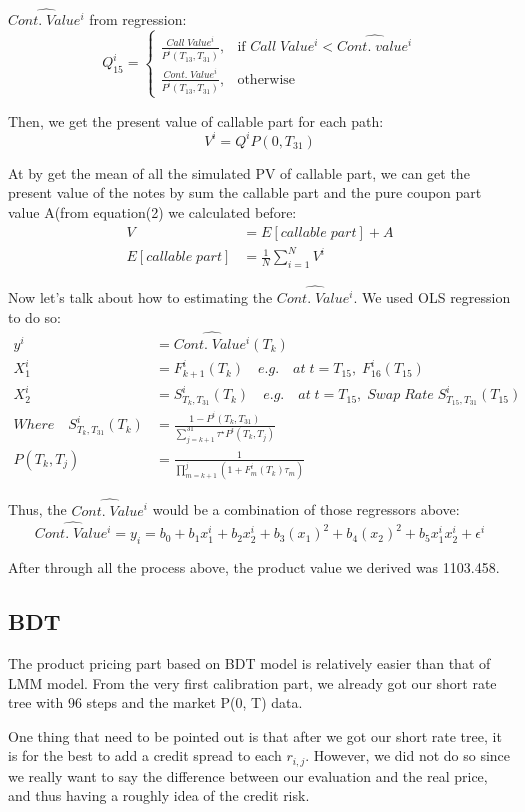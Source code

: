 \documentclass[paper = letterpaper, fontsize=12pt]{article}
\begin{document}
$\hat{Cont.\;Value^i}$ from regression:
\[
    Q_{15}^i = 
\begin{cases}
    \frac{Call\;Value^i}{P^i(T_{13}, T_{31})},& \text{if } Call\;Value^i< \hat{Cont.\; value^i}\\
    \frac{Cont.\;Value^i}{P^i(T_{13}, T_{31})},              & \text{otherwise}
\end{cases}
\]

Then, we get the present value of callable part for each path:
\[
  V^i = Q^iP(0, T_{31})
\]

At by get the mean of all the simulated PV of callable part, we can get the present value of the notes by sum the callable part and the pure coupon part value A(from equation(2) we calculated before:
\begin{align}
  V &= E[callable\;part]+ A\\
  E[callable\;part] &= \frac{1}{N} \sum_{i=1}^{N}V^i
\end{align}

Now let's talk about how to estimating the $\hat{Cont.\;Value^i}$. We used OLS regression to do so:
\begin{align}
  y^i &= \hat{Cont.\;Value^i}(T_k)\\
  X_1^i &= F_{k+1}^i(T_k)\quad e.g. \quad at\;t=T_{15},\;F_{16}^i(T_{15})\\
  X_2^i &= S_{T_k, T_{31}}^i(T_k)\quad e.g. \quad at\;t=T_{15},\;Swap\;Rate\;S_{T_{15}, T_{31}}^i(T_{15})\\
  Where \quad S_{T_k, T_{31}}^i(T_k) &= \frac{1 - P^i(T_k, T_{31})}{\sum_{j=k+1}^{31} \tau^\star P^i(T_k, T_j)}\\
  P(T_k, T_j) &= \frac{1}{\prod_{m = k+1}^j(1+F_m^i(T_k)\tau_m)}
\end{align}

Thus, the $\hat{Cont.\;Value^i}$ would be a combination of those regressors above:
\[
\hat{Cont.\;Value^i} = y_i = b_0 + b_1x_1^i + b_2x_2^i + b_3(x_1)^2 + b_4(x_2)^2 + b_5x_1^ix_2^i + \epsilon^i
\]

After through all the process above, the product value we derived was 1103.458.
\subsection{BDT}
The product pricing part based on BDT model is relatively easier than that of LMM model. From the very first calibration part, we already got our short rate tree with 96 steps and the market P(0, T) data. 

One thing that need to be pointed out is that after we got our short rate tree, it is for the best to add a credit spread to each $r_{i,j}$. However, we did not do so since we really want to say the difference between our evaluation and the real price, and thus having a roughly idea of the credit risk.
\end{document}
